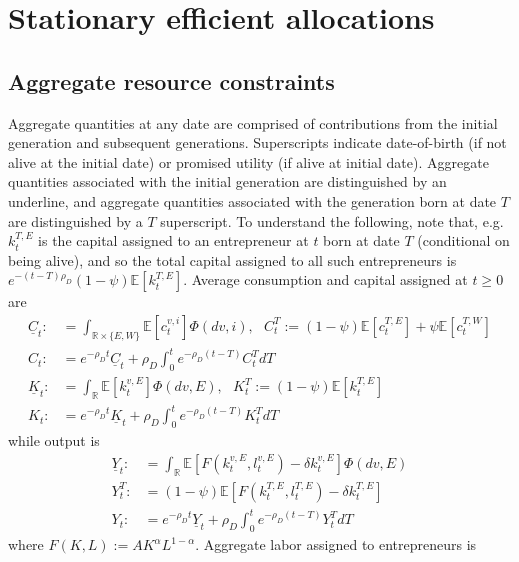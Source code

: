 \documentclass[11pt]{article}
\theoremstyle{plain}
\theoremstyle{definition} %
\begin{document}
\section{Stationary efficient allocations} \label{STATdecent}
\subsection{Aggregate resource constraints}\label{ARESC}


Aggregate quantities at any date are comprised of contributions from the initial generation and subsequent generations. Superscripts indicate date-of-birth (if not alive at the initial date) or promised utility (if alive at initial date). Aggregate quantities associated with the initial generation are distinguished by an underline, and aggregate quantities associated with the generation born at date $T$ are distinguished by a $T$ superscript. To understand the following, note that, e.g. $k^{T,E}_t$ is the capital assigned to an entrepreneur at $t$ born at date $T$ (conditional on being alive), and so the total capital assigned to all such entrepreneurs is $e^{-(t-T)\rho_D}(1-\psi)\mathbb{E}[k^{T,E}_t]$. Average consumption and capital assigned at $t\geq0$ are 
\begin{align*} 
\underline{C}_t : & = \int_{\mathbb{R} \times \{E,W\}}\mathbb{E}[c^{v,i}_t]\Phi(dv, i), 
\ \ \ C^T_t := (1-\psi)\mathbb{E}[c^{T,E}_t] + \psi \mathbb{E}[c^{T,W}_t]
\\ C_t : & = e^{- \rho_D t}\underline{C}_t  + \rho_D\int_{0}^{t}e^{-\rho_D (t-T)} C^T_tdT
\\ \underline{K}_t : & = \int_{\mathbb{R}}\mathbb{E}[k^{v,E}_t]\Phi(dv, E), 
\ \ \ K^T_t := (1-\psi)\mathbb{E}[k^{T,E}_t]
\\ K_t : & = e^{- \rho_D t}\underline{K}_t + \rho_D\int_{0}^te^{-\rho_D (t-T)} K^T_tdT
\end{align*}
while output is 
\begin{align*}
\underline{Y}_t : & = \int_{\mathbb{R}}\mathbb{E}[F(k^{v,E}_t, l^{v,E}_t) - \delta k^{v,E}_t]\Phi(dv, E) 
\\ Y^T_t : & = (1 - \psi) \mathbb{E}[F(k^{T,E}_t, l^{T,E}_t) - \delta k^{T,E}_t]
\\ Y_t : & = e^{-\rho_D t}\underline{Y}_t + \rho_D\int_0^te^{-\rho_D (t-T)} Y^T_tdT 
\end{align*}
where $F(K,L) := AK^{\alpha}L^{1-\alpha}$. Aggregate labor assigned to entrepreneurs is
\end{document}
